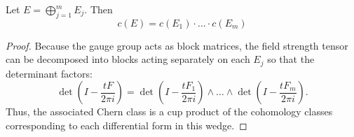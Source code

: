 		
 		\begin{prop}
 			Let $E = \bigoplus_{j=1}^m E_j$. Then
 			\[
 				c(E) = c(E_1) \cdot \dots \cdot c(E_m)
 			\]
 		\end{prop}
 		\begin{proof}
 			Because the gauge group acts as block matrices, the field strength tensor can be decomposed into blocks acting separately on each $E_j$ so that the determinant factors:
 			\[
 				\det\left(I - \frac{t F}{2\pi i}\right) = \det\left(I - \frac{t F_1}{2\pi i}\right) \wedge \dots \wedge \det \left(I - \frac{t F_m}{2\pi i}\right).
 			\]
			Thus, the associated Chern class is a cup product of the cohomology classes corresponding to each differential form in this wedge.
 		\end{proof}
		 